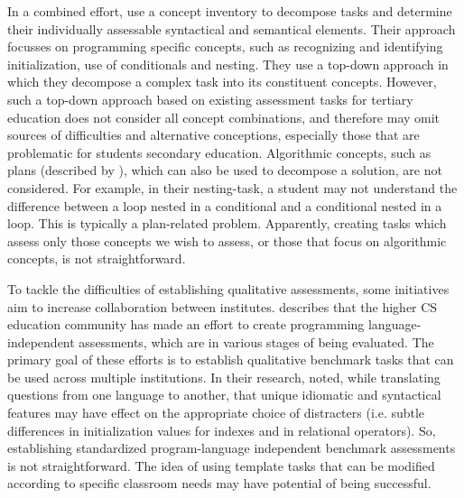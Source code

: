 In a combined effort,  use a concept inventory to decompose tasks and determine their individually assessable syntactical and semantical elements. Their approach focusses on programming specific concepts, such as recognizing and identifying initialization, use of conditionals and nesting. They use a top-down approach in which they decompose a complex task into its constituent concepts.  However, such a top-down approach based on existing assessment tasks for tertiary education does not consider all concept combinations, and therefore may omit sources of difficulties and alternative conceptions, especially those that are problematic for students secondary education. Algorithmic concepts, such as plans (described by ), which can also be used to decompose a solution, are not considered. For example, in their nesting-task, a student may not understand the difference between a loop nested in a conditional and a conditional nested in a loop. This is typically a plan-related problem. Apparently, creating tasks which assess only those concepts we wish to assess, or those that focus on algorithmic concepts, is not straightforward.



To tackle the difficulties of establishing qualitative assessments, some initiatives aim to increase collaboration between institutes.  describes that the higher CS education community has made an effort to create programming language-independent assessments, which are in various stages of being evaluated. The primary goal of these efforts is to establish qualitative benchmark tasks that can be used across multiple institutions. In their research,  noted, while translating questions from one language to another, that unique idiomatic and syntactical features may have effect on the appropriate choice of distracters (i.e. subtle differences in initialization values for indexes and in relational operators). So, establishing standardized program-language independent benchmark assessments is not straightforward. The idea of using template tasks that can be modified according to specific classroom needs may have potential of being successful.


